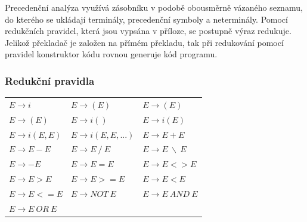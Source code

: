 Precedenční analýza využívá zásobníku v podobě obousměrně vázaného seznamu, do kterého se ukládají terminály,
precedenční symboly a neterminály. Pomocí redukčních pravidel, která jsou vypsána v příloze, se postupně výraz redukuje. 
Jelikož překladač je založen na přímém překladu, tak při redukování pomocí pravidel konstruktor kódu rovnou generuje kód programu.

\subsubsection{Redukční pravidla}


\begin{table}[htbp]
\centering
\label{Redukční pravidla}
\begin{tabular}{lll}
    $E \to i$ &  $E \to (E)$ & $E \to (E)$ \\
    $E \to (E)$ & $E \to i()$ & $E \to i(E)$\\
    $E \to i(E, E)$ & $E \to i(E, E, ...)$ &  $E \to E + E$\\
    $E \to E - E$ & $E \to E ~ / ~ E$ & $E \to E ~ \backslash ~ E$\\
    $E \to - E$ &  $E \to E = E$ & $E \to E <> E$\\
    $E \to E > E$ & $E \to E >= E$ & $E \to E < E$\\
    $E \to E <= E$ & $E \to NOT ~ E$ & $E \to E ~ AND ~ E$\\
    $E \to E ~ OR ~ E$ & & \\
\end{tabular}
\end{table}


